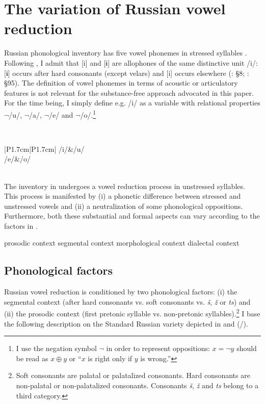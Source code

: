 \documentclass[output=paper,modfonts,newtxmath,hidelinks,]{langscibook}
\begin{document}
\section{The variation of Russian vowel reduction}\label{5:s2}

Russian phonological inventory has five vowel phonemes in stressed syllables . Following \citet[§19]{Garde1998}, I admit that [i] and [ɨ] are allophones of the same distinctive unit /i/: [ɨ] occurs after hard consonants (except velars) and [i] occurs elsewhere (\citealt{Avanesov1968}: §8; \citealt{Garde1998}: §95). The definition of vowel phonemes in terms of acoustic or articulatory features is not relevant for the substance-free approach advocated in this paper. For the time being, I simply define e.g. /i/ as a variable with relational properties $\neg$/u/, $\neg$/a/, $\neg$/e/ and $\neg$/o/.\footnote{\label{5:fn1}I use the negation symbol $\neg$ in order to represent oppositions: $x=\neg y$ should be read as $x\oplus y$ or “$x$ is right only if $y$ is wrong.”}

\label{5:1}\\\medskip
\begin{tabular}{|P{1.7cm}|P{1.7cm}|}
\hline
/i/&/u/\\\hline
/e/&/o/\\\hline
{}\\\hline
\end{tabular}
\z

\noindent The inventory in  undergoes a vowel reduction process in unstressed syllables. This process is manifested by (i) a phonetic difference between stressed and unstressed vowels and (ii) a neutralization of some phonological oppositions. Furthermore, both these substantial and formal aspects can vary according to the factors in .

\ea\label{5:2}\ea prosodic context
\ex segmental context
\ex morphological context
\ex dialectal context
\z\z

\subsection{Phonological factors}\label{5:s2.1}

Russian vowel reduction is conditioned by two phonological factors: (i) the segmental context (after hard consonants vs. soft consonants vs. \textit{š}, \textit{ž} or \textit{ts}) and (ii) the prosodic context (first pretonic syllable vs. non-pretonic syllables).\footnote{Soft consonants are palatal or palatalized consonants. Hard consonants are non-palatal or non-palatalized consonants. Consonants \textit{š}, \textit{ž} and \textit{ts} belong to a third category.} I base the following description on the Standard Russian variety depicted in \citet{Avanesov1968} and \citeauthor{Garde1980} (\citeyear{Garde1980}/\citeyear{Garde1998}).
\end{document}
